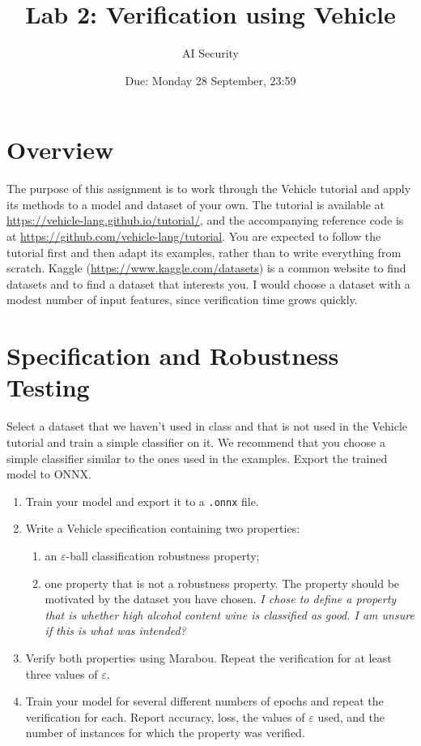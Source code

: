 \documentclass[11pt,a4paper]{article}
\title{Lab 2: Verification using Vehicle}
\author{AI Security}
\date{Due: Monday 28 September, 23:59}
\newcommand{\done}{\checkmark}
\begin{document}
\maketitle

\section*{Overview}

The purpose of this assignment is to work through the Vehicle tutorial and apply its methods to a model and dataset of your own. The tutorial is available at \url{https://vehicle-lang.github.io/tutorial/}, and the accompanying reference code is at \url{https://github.com/vehicle-lang/tutorial}. You are expected to follow the tutorial first and then adapt its examples, rather than to write everything from scratch. Kaggle (\url{https://www.kaggle.com/datasets}) is a common website to find datasets and to find a dataset that interests you. I would choose a dataset with a modest number of input features, since verification time grows quickly.

\section{Specification and Robustness Testing}

Select a dataset that we haven't used in class and that is not used in the Vehicle tutorial and train a simple classifier on it. We recommend that you choose a simple classifier similar to the ones used in the examples. Export the trained model to ONNX.

\begin{enumerate}[leftmargin=*]
  \item Train your model and export it to a \texttt{.onnx} file. \done

  \item Write a Vehicle specification containing two properties:
    \begin{enumerate}[label=(\alph*)]
      \item an $\varepsilon$-ball classification robustness property; \done
      \item one property that is not a robustness property. The property should be motivated by the dataset you have chosen. \done \textit{I chose to define a property that is whether high alcohol content wine is classified as good. I am unsure if this is what was intended?}
    \end{enumerate}

  \item Verify both properties using Marabou. Repeat the verification for at least three values of $\varepsilon$. \done

  \item Train your model for several different numbers of epochs and repeat the verification for each. Report accuracy, loss, the values of $\varepsilon$ used, and the number of instances for which the property was verified. \done
\end{enumerate}
\end{document}

